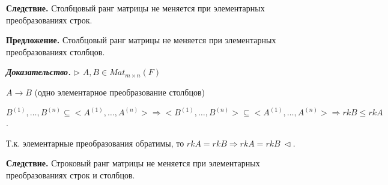 \vspace{\baselineskip}
\textbf{Следствие.} Столбцовый ранг матрицы не меняется при элементарных преобразованиях строк.

\vspace{\baselineskip}
\textbf{Предложение.} Столбцовый ранг матрицы не меняется при элементарных преобразованиях столбцов.

\vspace{\baselineskip}
\textbf{\textit{Доказательство.}} $\rhd$ $A, B \in Mat_{m \times n} (F)$

$A \rightarrow B$ (одно элементарное преобразование столбцов)

$B^{(1)}, \dots, B^{(n)} \subseteq <A^{(1)}, \dots, A^{(n)}> \Rightarrow <B^{(1)}, \dots, B^{(n)}> \subseteq <A^{(1)}, \dots, A^{(n)}> \Rightarrow rkB \leq rkA$.

Т.к. элементарные преобразования обратимы, то $rkA = rkB \Rightarrow rkA = rkB \ \lhd$.

\vspace{\baselineskip}
\textbf{Следствие.} Строковый ранг матрицы не меняется при элементарных преобразованиях строк и столбцов.

